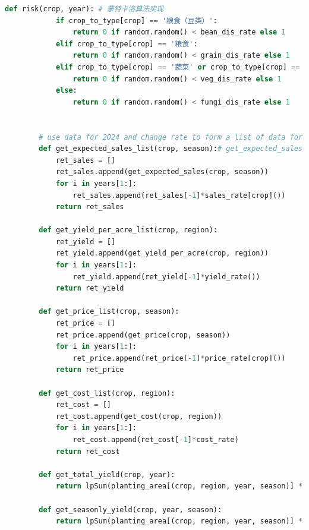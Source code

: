 \documentclass[withoutpreface]{cumcmthesis}
\begin{document}
\begin{appendices}
\begin{lstlisting}[language=python]
        def risk(crop, year): # 蒙特卡洛算法实现
            if crop_to_type[crop] == '粮食（豆类）':
                return 0 if random.random() < bean_dis_rate else 1
            elif crop_to_type[crop] == '粮食':
                return 0 if random.random() < grain_dis_rate else 1
            elif crop_to_type[crop] == '蔬菜' or crop_to_type[crop] == '蔬菜（豆类）':
                return 0 if random.random() < veg_dis_rate else 1
            else:
                return 0 if random.random() < fungi_dis_rate else 1
    
    
        # use data for 2024 and change rate to form a list of data for 2024-2030
        def get_expected_sales_list(crop, season):# get_expected_sales(crop, season)[year-2024]
            ret_sales = []
            ret_sales.append(get_expected_sales(crop, season))
            for i in years[1:]:
                ret_sales.append(ret_sales[-1]*sales_rate[crop]())
            return ret_sales
        
        def get_yield_per_acre_list(crop, region):
            ret_yield = []
            ret_yield.append(get_yield_per_acre(crop, region))
            for i in years[1:]:
                ret_yield.append(ret_yield[-1]*yield_rate())
            return ret_yield
        
        def get_price_list(crop, season):
            ret_price = []
            ret_price.append(get_price(crop, season))
            for i in years[1:]:
                ret_price.append(ret_price[-1]*price_rate[crop]())
            return ret_price
        
        def get_cost_list(crop, region):
            ret_cost = []
            ret_cost.append(get_cost(crop, region))
            for i in years[1:]:
                ret_cost.append(ret_cost[-1]*cost_rate)
            return ret_cost
        
        def get_total_yield(crop, year):
            return lpSum(planting_area[(crop, region, year, season)] * get_yield_per_acre_list(crop, region)[year-2024] for region in regions for season in seasons)
        
        def get_seasonly_yield(crop, year, season):
            return lpSum(planting_area[(crop, region, year, season)] * get_yield_per_acre_list(crop, region)[year-2024] for region in regions)
        

\end{lstlisting}
\end{appendices}
\end{document}

